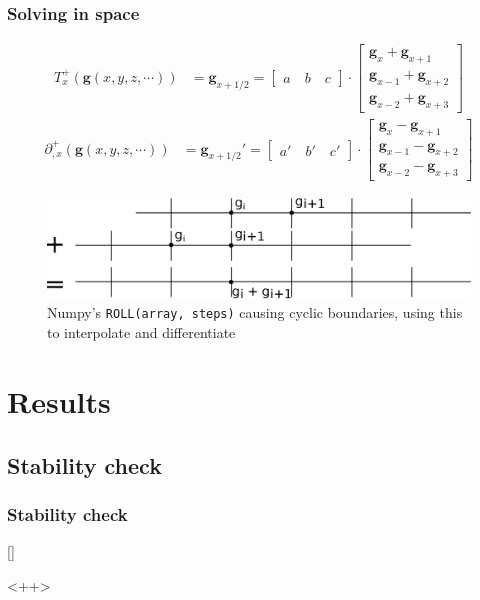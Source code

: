 \documentclass{beamer}
\begin{document}
\begin{frame}[shrink=20]

\frametitle{Solving in space}

\begin{align}
    T^+_x(\mathbf{g}(x, y, z, \cdots)) &=  \mathbf{g}_{x+1/2} = 
    \begin{bmatrix}
        a \quad b \quad c
    \end{bmatrix}
    \cdot
    \begin{bmatrix}
        \mathbf{g}_x + \mathbf{g}_{x+1} \\
        \mathbf{g}_{x-1} + \mathbf{g}_{x+2} \\
        \mathbf{g}_{x-2} + \mathbf{g}_{x+3}
    \end{bmatrix}
\end{align}
\begin{align}
    \partial^+_{,x}(\mathbf{g}(x, y, z, \cdots)) &=  \mathbf{g}_{x+1/2}' = 
    \begin{bmatrix}
        a' \quad b' \quad c'
    \end{bmatrix}
    \cdot
    \begin{bmatrix}
        \mathbf{g}_x - \mathbf{g}_{x+1} \\
        \mathbf{g}_{x-1} - \mathbf{g}_{x+2} \\
        \mathbf{g}_{x-2} - \mathbf{g}_{x+3}
    \end{bmatrix}
    \label{eq:deriv}
\end{align}

\begin{figure}[htpb]
    \centering
    \includegraphics[width=\columnwidth]{roll.eps}
    \caption{Numpy's \texttt{ROLL(array, steps)} causing cyclic boundaries, using this to interpolate and differentiate}
    \label{fig:roll}
\end{figure}

\end{frame}

\section{Results}
\subsection{Stability check}
\begin{frame}
    \frametitle{Stability check}
    \href{http://77.237.250.152/wordpress/studier/stability_web.mp4}[]


\end{frame}<++>
\end{document}
